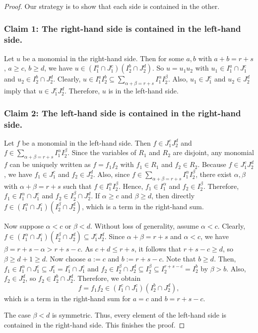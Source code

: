 \documentclass[11pt]{amsart}
\begin{document}
\begin{proof}
Our strategy is to  show that each side is contained in the other.

\subsubsection*{Claim 1: The right-hand side is contained in the left-hand side.}

Let \( u \) be a monomial in  the right-hand side. Then for some \( a, b \) with \( a + b = r + s \), \( a \geq c \), \( b \geq d \), we have 
$u \in (I_1^a \cap J_1^c)(I_2^b \cap J_2^d)$. So \( u= u_1 u_2 \) with \( u_1 \in I_1^a \cap J_1^c \) and \( u_2 \in I_2^b \cap J_2^d \). Clearly, \( u \in I_1^a I_2^b \subseteq \sum_{\alpha + \beta = r + s} I_1^\alpha I_2^\beta \). Also, \( u_1 \in J_1^c \) and \( u_2 \in J_2^d \) imply that  \( u \in J_1^c J_2^d \). Therefore, \( u \) is in the left-hand side.

\subsubsection*{Claim 2:  The left-hand side is contained in the right-hand side.}

Let \( f \) be a monomial in  the left-hand side. Then \( f \in J_1^c J_2^d \) and \( f \in \sum_{\alpha + \beta = r + s} I_1^\alpha I_2^\beta \). 
Since the variables of \( R_1 \) and \( R_2 \) are disjoint, any monomial \( f \) can be uniquely written as \( f = f_1 f_2 \) with \( f_1 \in R_1 \) and \( f_2 \in R_2 \). Because \( f \in J_1^c J_2^d \), we have \( f_1 \in J_1^c \) and \( f_2 \in J_2^d \). Also, since \( f \in \sum_{\alpha + \beta = r + s} I_1^\alpha I_2^\beta \), there exist \( \alpha, \beta \) with \( \alpha + \beta = r + s \) such that \( f \in I_1^\alpha I_2^\beta \). Hence, \( f_1 \in I_1^\alpha \) and \( f_2 \in I_2^\beta \). 
Therefore, $f_1 \in I_1^\alpha \cap J_1^c$ and $f_2 \in I_2^\beta \cap J_2^d$. 
If \( \alpha \geq c \) and \( \beta \geq d \), then directly \( f \in (I_1^\alpha \cap J_1^c)(I_2^\beta \cap J_2^d) \), which is a term in the right-hand sum.

Now suppose \( \alpha < c \) or \( \beta < d \). Without loss of generality, assume \( \alpha < c \). Clearly,   $f \in (I_1^\alpha \cap J_1^c)(I_2^\beta \cap J_2^d) \subseteq J_1^c J_2^d.$ 
Since \( \alpha + \beta = r + s \) and \( \alpha < c \), we have \( \beta = r + s - \alpha > r + s - c \). As \( c + d \leq r + s \), it follows that \( r + s - c \geq d \), so \( \beta \geq d + 1 \geq d \). Now choose \( a:= c \) and \( b:= r + s - c \). Note that \( b \geq d \). Then, 
$f_1 \in I_1^\alpha \cap J_1^c \subseteq J_1^c = I_1^c \cap J_1^c$ and $f_2 \in I_2^\beta \cap J_2^d \subseteq I_2^\beta \subseteq I_2^{r + s - c} = I_2^b$ 
by  \( \beta >b\). Also, \(f_2 \in J_2^d \), so \( f_2 \in I_2^b \cap J_2^d \). Therefore, we obtain 
\[
f=f_1f_2 \in (I_1^c \cap J_1^c)(I_2^b \cap J_2^d),
\]
which is a term in the right-hand sum  for \( a = c \)  and  \( b = r + s - c \). 

The case \( \beta < d \) is symmetric. Thus, every element of the left-hand side is contained in the right-hand side. This finishes the proof. 
\end{proof}
\end{document}
